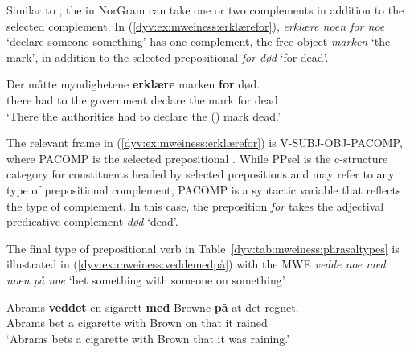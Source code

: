 \documentclass[output=paper]{langsci/langscibook}
\begin{document}
Similar to , the  in NorGram can take one or two complements in addition to the selected complement. 
In (\ref{dyv:ex:mweiness:erklærefor}), \emph{erklære noen for noe} `declare someone something' has one complement, the free object \emph{marken} `the mark',  in addition to the selected prepositional   \emph{for død} `for dead'. 

\ea\label{dyv:ex:mweiness:erklærefor}
\gll   Der måtte myndighetene \textbf{erklære} marken \textbf{for} død. \\
        there {had to} {the government} declare {the mark} for dead \\
\glt `There the authorities had to declare the () mark dead.'\\ 
\z

The relevant frame in (\ref{dyv:ex:mweiness:erklærefor}) is V-SUBJ-OBJ-PACOMP, where PACOMP is the selected prepositional .
While PPsel is the c-structure category for constituents headed by selected prepositions and may refer to any type of prepositional complement, PACOMP is a syntactic variable that reflects the type of complement. %
In this case, the preposition \emph{for} takes the adjectival predicative complement \emph{død} `dead'. %

The final type of prepositional verb in Table~\ref{dyv:tab:mweiness:phrasaltypes} is illustrated in (\ref{dyv:ex:mweiness:veddemedpå}) with the MWE \emph{vedde noe med noen på noe} `bet something with someone on something'. 

\ea\label{dyv:ex:mweiness:veddemedpå}
\gll   Abrams \textbf{veddet} en sigarett \textbf{med} Browne \textbf{på} at det regnet. \\
        Abrams bet a cigarette with Brown on that it rained \\
\glt `Abrams bets a cigarette with Brown that it {was raining}.' \\ 
\z
\end{document}
